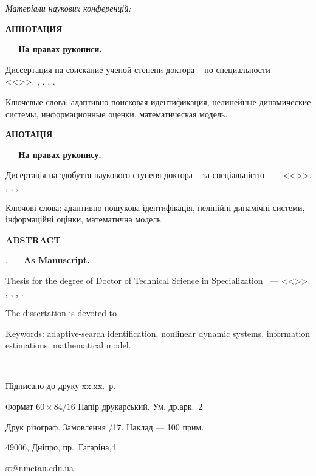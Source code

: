 \documentclass[a4paper,13pt]{atuaref}
\newcommand{\xsect}[1]{\medskip\begin{center}\textbf{#1}\end{center}\medskip\penalty10000}
\newcommand{\xxxsect}[1]{\smallskip\textit{#1}\smallskip\penalty10000}
\begin{document}
\xxxsect{Матеріали наукових конференцій:}

\printbibliography[heading=none, keyword=confer]



\xsect{АННОТАЦИЯ}

\textbf{\dissauthorRu}
\textbf{\booknameRu}
\textbf{--- На правах рукописи.}

Диссертация на соискание ученой степени
доктора
\dissScopeRu\ {}
по специальности
\dissSpecId\ --- <<\dissSpecRu>>.
\institutionRu, \belongRu, \cityRu, \bookyear.


Ключевые слова:
адаптивно-поисковая идентификация, нелинейные динамические системы,
информационные оценки, математическая модель.


\xsect{АНОТАЦІЯ}

\textbf{\dissauthorUa}
\textbf{\booknameUa}
\textbf{--- На правах рукопису.}

Дисертація на здобуття наукового ступеня
доктора
\dissScopeUa\ {}
за спеціальністю
\dissSpecId\ --- <<\dissSpecUa>>.
\institutionUa, \belongUa, \cityUa, \bookyear.


Ключові слова: адаптивно-пошукова ідентифікація, нелінійні динамічні
системи, інформаційні оцінки, математична модель.



\xsect{ABSTRACT}

\textbf{\dissauthorEn}
\textbf{\booknameEn}.
\textbf{--- As Manuscript.}

Thesis for the degree of Doctor of Technical Science in Specialization
\dissSpecId\ --- <<\dissSpecEn>>.
\institutionEn, \belongEn, \cityEn, \bookyear.

The dissertation is devoted to

Keywords: adaptive-search identification, nonlinear dynamic systems,
information estimations, mathematical model.

\clearpage

{~}
\vfill

\begin{center}


Підписано до друку xx.xx.\bookyear~р.

Формат $60 \times 84/16$  Папір друкарський. Ум. др.арк.~2

Друк різограф. Замовлення /17. Наклад --- 100 прим.


49006, Дніпро, пр.~Гагаріна,4

st@nmetau.edu.ua

\end{center}

\vfill
\end{document}
